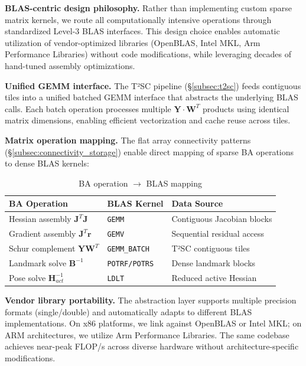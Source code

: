 \textbf{BLAS-centric design philosophy.} Rather than implementing custom sparse matrix kernels, 
we route all computationally intensive operations through standardized Level-3 BLAS interfaces. 
This design choice enables automatic utilization of vendor-optimized libraries (OpenBLAS, Intel MKL, 
Arm Performance Libraries) without code modifications, while leveraging decades of hand-tuned 
assembly optimizations.

\textbf{Unified GEMM interface.} The T²SC pipeline (§\ref{subsec:t2sc}) feeds contiguous tiles 
into a unified batched GEMM interface that abstracts the underlying BLAS calls. Each batch operation 
processes multiple $\mathbf{Y} \cdot \mathbf{W}^T$ products using identical matrix dimensions, 
enabling efficient vectorization and cache reuse across tiles.

\textbf{Matrix operation mapping.} The flat array connectivity patterns (§\ref{subsec:connectivity_storage}) 
enable direct mapping of sparse BA operations to dense BLAS kernels:

\begin{table}[h]
  \centering
  \caption{BA operation $\rightarrow$ BLAS mapping}
  \label{tab:blas_mapping}
  \begin{tabular}{lll}
    \toprule
    \textbf{BA Operation}         & \textbf{BLAS Kernel}    & \textbf{Data Source}                     \\
    \midrule
    Hessian assembly $\mathbf{J}^T \mathbf{J}$     & \texttt{GEMM}           & Contiguous Jacobian blocks               \\
    Gradient assembly $\mathbf{J}^T \mathbf{r}$    & \texttt{GEMV}           & Sequential residual access               \\
    Schur complement $\mathbf{Y} \mathbf{W}^T$     & \texttt{GEMM\_BATCH}    & T²SC contiguous tiles                   \\
    Landmark solve $\mathbf{B}^{-1}$               & \texttt{POTRF/POTRS}    & Dense landmark blocks                    \\
    Pose solve $\mathbf{H}_{act}^{-1}$             & \texttt{LDLT}           & Reduced active Hessian                   \\
    \bottomrule
  \end{tabular}
\end{table}

\textbf{Vendor library portability.} The abstraction layer supports multiple precision formats 
(single/double) and automatically adapts to different BLAS implementations. On x86 platforms, 
we link against OpenBLAS or Intel MKL; on ARM architectures, we utilize Arm Performance Libraries. 
The same codebase achieves near-peak FLOP/s across diverse hardware without architecture-specific 
modifications.

